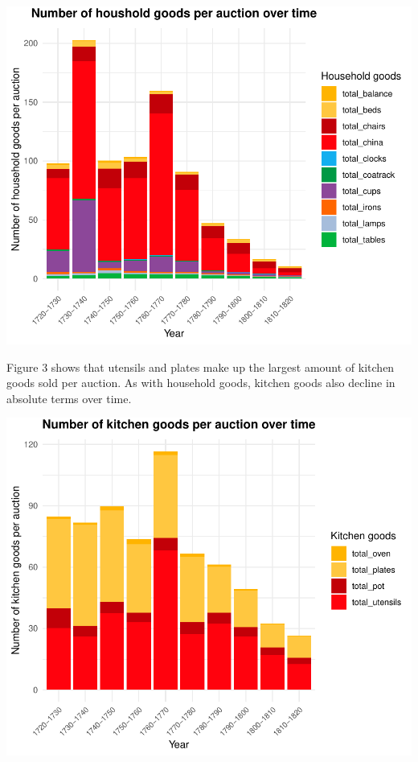 \documentclass[11pt,preprint, authoryear]{elsarticle}
\numberwithin{equation}{section}
\numberwithin{figure}{section}
\numberwithin{table}{section}
\begin{document}
\begin{center}\includegraphics{Project_write_up_files/figure-latex/Figure2-1} \end{center}

Figure 3 shows that utensils and plates make up the largest amount of
kitchen goods sold per auction. As with household goods, kitchen goods
also decline in absolute terms over time.

\begin{center}\includegraphics{Project_write_up_files/figure-latex/Figure3-1} \end{center}
\end{document}
